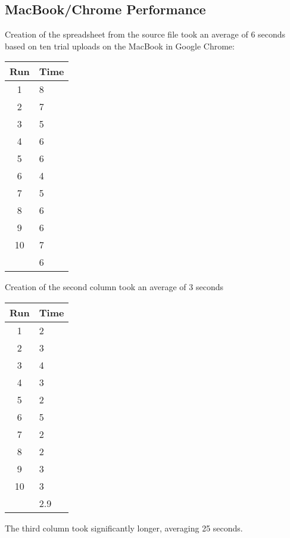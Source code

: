 \documentclass[12pt,oneside,letterpaper,titlepage]{article}
\begin{document}


\subsection{MacBook/Chrome Performance}

Creation of the spreadsheet from the source file took an average of 6 seconds
based on ten trial uploads on the MacBook in Google Chrome:

\begin{tabular}{| c | l |}
  \hline
  Run  & Time \\ \hline
  1    & 8    \\ \hline
  2    & 7    \\ \hline
  3    & 5    \\ \hline
  4    & 6    \\ \hline
  5    & 6    \\ \hline
  6    & 4    \\ \hline
  7    & 5    \\ \hline
  8    & 6    \\ \hline
  9    & 6    \\ \hline
  10   & 7    \\ \hline
       & 6    \\
  \hline
\end{tabular}

Creation of the second column took an average of 3 seconds

\begin{tabular}{| c | l |}
  \hline
  Run  & Time \\ \hline
  1    & 2    \\ \hline
  2    & 3    \\ \hline
  3    & 4    \\ \hline
  4    & 3    \\ \hline
  5    & 2    \\ \hline
  6    & 5    \\ \hline
  7    & 2    \\ \hline
  8    & 2    \\ \hline
  9    & 3    \\ \hline
  10   & 3    \\ \hline
       & 2.9  \\
  \hline
\end{tabular}

The third column took significantly longer, averaging 25 seconds.
\end{document}
